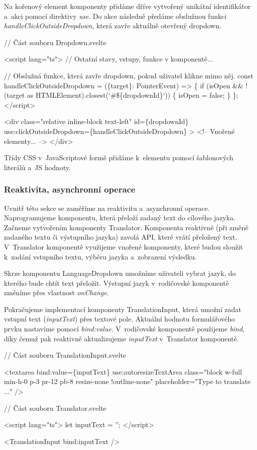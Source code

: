 Na kořenový element komponenty přidáme dříve vytvořený unikátní identifikátor a~akci pomocí direktivy \emph{use}. 
Do akce následně předáme obslužnou funkci \emph{handleClickOutsideDropdown}, která zavře aktuálně otevřený dropdown.

\begin{prog}
// Část souboru Dropdown.svelte

<script lang="ts">
  // Ostatní stavy, vstupy, funkce v komponentě...

  // Obslužná funkce, která zavře dropdown, pokud uživatel klikne mimo něj.
  const handleClickOutsideDropdown = (\{target\}: PointerEvent) => \{
    if (isOpen && !(target as HTMLElement).closest(`#\$\{dropdownId\}`)) \{
      isOpen = false;
    \}
  \};
</script>
  
<div
  class="relative inline-block text-left"
  id=\{dropdownId\}
  use:clickOutsideDropdown=\{handleClickOutsideDropdown\}
>
  <!-- Vnořené elementy... -->
</div>
\end{prog}

Třídy CSS v~JavaScriptové formě přidáme k~elementu pomocí šablonových literálů a~JS hodnoty.

\subsubsection*{Reaktivita, asynchronní operace}

Uvnitř této sekce se zaměříme na reaktivitu a~asynchronní operace. Naprogramujeme komponentu, která přeloží zadaný text do cílového jazyka. 
Začneme vytvořením komponenty Translator. Komponenta reaktivně (při změně zadaného textu či výstupního jazyka) zavolá API, které vrátí přeložený text. 
V~Translator komponentě využijeme vnořené komponenty, které budou sloužit k~zadání vstupního textu, výběru jazyka a~zobrazení výsledku.

Skrze komponentu LanguageDropdown umožníme uživateli vybrat jazyk, do kterého bude chtít text přeložit. Výstupní jazyk v~rodičovské komponentě změníme přes vlastnost \emph{onChange}.

Pokračujeme implementací komponenty TranslationInput, která umožní zadat vstupní text (\emph{inputText}) přes textové pole. Aktuální hodnotu formulářového prvku nastavíme pomocí \emph{bind:value}. 
V~rodičovské komponentě použijeme \emph{bind}, díky čemuž pak reaktivně aktualizujeme \emph{inputText} v~Translator komponentě.

\begin{prog}
// Část souboru TranslationInput.svelte

<textarea
  bind:value=\{inputText\}
  use:autoresizeTextArea
  class="block w-full min-h-0 p-3 pr-12 pb-8 resize-none !outline-none"
  placeholder="Type to translate ..."
/>

// Část souboru Translator.svelte

<script lang="ts">
  let inputText = '';
</script>

<TranslationInput bind:inputText />
\end{prog}

